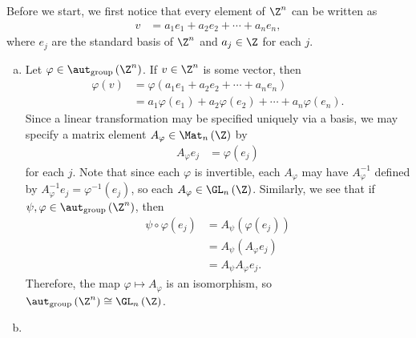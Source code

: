 \documentclass[10pt]{mypackage}
\begin{document}
\begin{solution}
  Before we start, we first notice that every element of $\Z^{n}$ can be written as
    \begin{align*}
      v &= a_1e_1 + a_2e_2 + \cdots + a_ne_n,
    \end{align*}
    where $e_j$ are the standard basis of $\Z^n$ and $a_j\in \Z$ for each $j$.
  \begin{enumerate}[(a)]
    \item Let $\varphi\in \aut_{\text{group}}\left( \Z^{n} \right)$. If $v\in \Z^{n}$ is some vector, then
      \begin{align*}
        \varphi\left( v \right) &= \varphi\left( a_1e_1 + a_2e_2 + \cdots + a_ne_n \right)\\
                                &= a_1\varphi\left( e_1 \right) + a_2\varphi\left( e_2 \right) + \cdots + a_n\varphi\left( e_n \right).
      \end{align*}
      Since a linear transformation may be specified uniquely via a basis, we may specify a matrix element $A_{\varphi}\in \Mat_{n}\left( \Z \right)$ by
      \begin{align*}
        A_{\varphi}e_j &= \varphi\left( e_j \right)
      \end{align*}
      for each $j$. Note that since each $\varphi$ is invertible, each $A_{\varphi}$ may have $A_{\varphi}^{-1}$ defined by $A_{\varphi}^{-1}e_j = \varphi^{-1}\left( e_j \right) $, so each $A_{\varphi}\in \GL_n\left( \Z \right)$. Similarly, we see that if $\psi,\varphi\in \aut_{\text{group}}\left( \Z^{n} \right)$, then
      \begin{align*}
        \psi\circ\varphi\left( e_j \right) &= A_{\psi}\left( \varphi\left( e_j \right) \right)\\
                                           &= A_{\psi}\left( A_{\varphi}e_j \right)\\
                                           &= A_{\psi}A_{\varphi}e_j.
      \end{align*}
      Therefore, the map $\varphi\mapsto A_{\varphi}$ is an isomorphism, so $\aut_{\text{group}}\left( \Z^{n} \right) \cong \GL_n\left( \Z \right)$.
    \item 
  \end{enumerate}
\end{solution}
\end{document}
